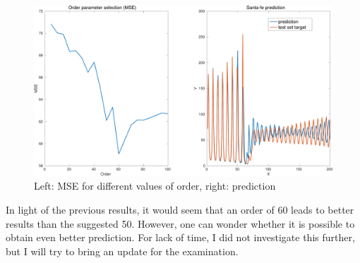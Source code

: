 \documentclass[11pt, a4paper]{article}
\begin{document}
\begin{figure}[H]
    \centering
    \includegraphics[scale=.40]{santafe_prediction.pdf}
    \caption{Left: MSE for different values of order, right: prediction}
    \label{fig:santa_prediction}
\end{figure}

In light of the previous results, it would seem that an order of 60
leads to better results than the suggested 50. However, one can wonder
whether it is possible to obtain even better prediction. For lack of
time, I did not investigate this further, but I will try to bring an
update for the examination.
\end{document}
